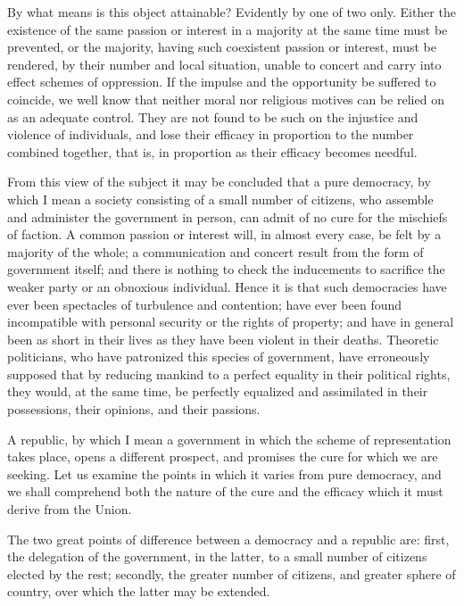 By what means is this object attainable? 
Evidently by one of two only. 
Either the existence of the same passion or interest in a majority at the same time must be prevented, or the majority, having such coexistent passion or interest, must be rendered, by their number and local situation, unable to concert and carry into effect schemes of oppression. 
If the impulse and the opportunity be suffered to coincide, we well know that neither moral nor religious motives can be relied on as an adequate control. 
They are not found to be such on the injustice and violence of individuals, and lose their efficacy in proportion to the number combined together, that is, in proportion as their efficacy becomes needful.

From this view of the subject it may be concluded that a pure democracy, by which I mean a society consisting of a small number of citizens, who assemble and administer the government in person, can admit of no cure for the mischiefs of faction. 
A common passion or interest will, in almost every case, be felt by a majority of the whole; a communication and concert result from the form of government itself; and there is nothing to check the inducements to sacrifice the weaker party or an obnoxious individual. 
Hence it is that such democracies have ever been spectacles of turbulence and contention; have ever been found incompatible with personal security or the rights of property; and have in general been as short in their lives as they have been violent in their deaths. 
Theoretic politicians, who have patronized this species of government, have erroneously supposed that by reducing mankind to a perfect equality in their political rights, they would, at the same time, be perfectly equalized and assimilated in their possessions, their opinions, and their passions.

A republic, by which I mean a government in which the scheme of representation takes place, opens a different prospect, and promises the cure for which we are seeking. 
Let us examine the points in which it varies from pure democracy, and we shall comprehend both the nature of the cure and the efficacy which it must derive from the Union.

The two great points of difference between a democracy and a republic are: first, the delegation of the government, in the latter, to a small number of citizens elected by the rest; secondly, the greater number of citizens, and greater sphere of country, over which the latter may be extended.

